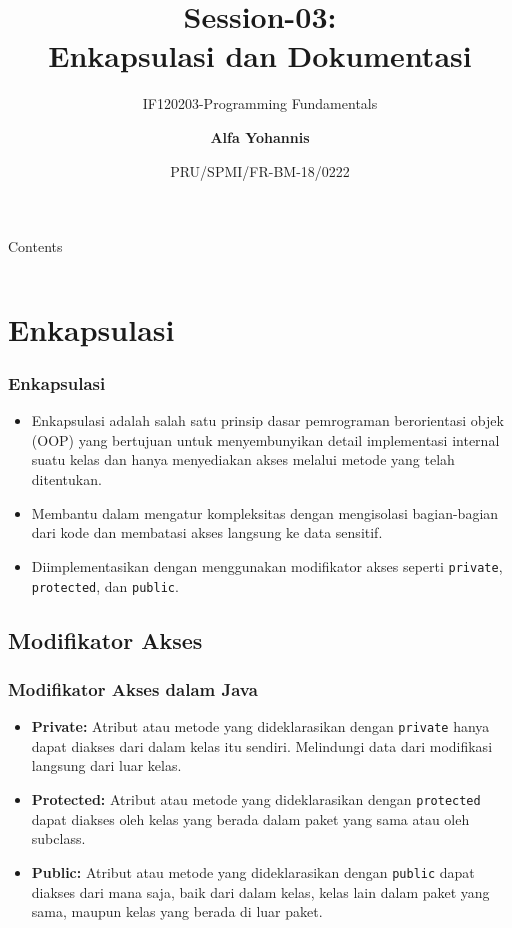 \documentclass[aspectratio=169, table]{beamer}
\subtitle{IF120203-Programming Fundamentals}
\title{Session-03:\\\LARGE{Enkapsulasi dan Dokumentasi}}
\date[Serial]{\scriptsize {PRU/SPMI/FR-BM-18/0222}}
\author[Pradita]{\small{\textbf{Alfa Yohannis}}}
\begin{document}
\frame{\titlepage}

\begin{frame}[fragile]{Contents}
\vspace{15pt}
\begin{columns}[t]
	\begin{column}{.5\textwidth}
		\tableofcontents[sections={1-3}]
	\end{column}
	\begin{column}{.5\textwidth}
		\tableofcontents[sections={4-6}]
	\end{column}
\end{columns}
\end{frame}

\section{Enkapsulasi}

\begin{frame}
\frametitle{Enkapsulasi}
\begin{itemize}
	\item Enkapsulasi adalah salah satu prinsip dasar pemrograman berorientasi objek (OOP) yang bertujuan untuk menyembunyikan detail implementasi internal suatu kelas dan hanya menyediakan akses melalui metode yang telah ditentukan.
	\item Membantu dalam mengatur kompleksitas dengan mengisolasi bagian-bagian dari kode dan membatasi akses langsung ke data sensitif.
	\item Diimplementasikan dengan menggunakan modifikator akses seperti \texttt{private}, \texttt{protected}, dan \texttt{public}.
\end{itemize}
\end{frame}

\subsection{Modifikator Akses}

\begin{frame}
\frametitle{Modifikator Akses dalam Java}
\begin{itemize}
	\item \textbf{Private:} Atribut atau metode yang dideklarasikan dengan \texttt{private} hanya dapat diakses dari dalam kelas itu sendiri. Melindungi data dari modifikasi langsung dari luar kelas.
	\item \textbf{Protected:} Atribut atau metode yang dideklarasikan dengan \texttt{protected} dapat diakses oleh kelas yang berada dalam paket yang sama atau oleh subclass.
	\item \textbf{Public:} Atribut atau metode yang dideklarasikan dengan \texttt{public} dapat diakses dari mana saja, baik dari dalam kelas, kelas lain dalam paket yang sama, maupun kelas yang berada di luar paket.
\end{itemize}
\end{frame}
\end{document}
